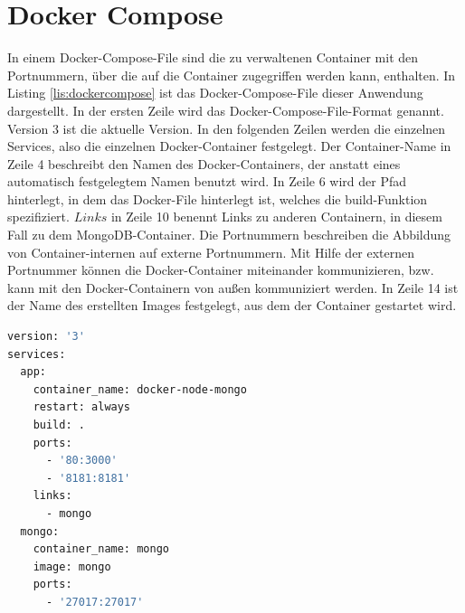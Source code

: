 \section{Docker Compose}\label{sec:Docker-Compose}
In einem Docker-Compose-File sind die zu verwaltenen Container mit den Portnummern, über die auf die Container zugegriffen werden kann, enthalten. In Listing \ref{lis:dockercompose} ist das Docker-Compose-File dieser Anwendung dargestellt. In der ersten Zeile wird das Docker-Compose-File-Format genannt. Version 3 ist die aktuelle Version. In den folgenden Zeilen werden die einzelnen Services, also die einzelnen Docker-Container festgelegt. Der Container-Name in Zeile 4 beschreibt den Namen des Docker-Containers, der anstatt eines automatisch festgelegtem Namen benutzt wird. In Zeile 6 wird der Pfad hinterlegt, in dem das Docker-File hinterlegt ist, welches die build-Funktion spezifiziert. $Links$ in Zeile 10 benennt Links zu anderen Containern, in diesem Fall zu dem MongoDB-Container. Die Portnummern beschreiben die Abbildung von Container-internen auf externe Portnummern. Mit Hilfe der externen Portnummer können die Docker-Container miteinander kommunizieren, bzw. kann mit den Docker-Containern von außen kommuniziert werden. In Zeile 14 ist der Name des erstellten Images festgelegt, aus dem der Container gestartet wird.

\begin{lstlisting}[language=bash, caption={docker-compose.yml-File}, label=lis:dockercompose]
version: '3'
services:
  app:
    container_name: docker-node-mongo
    restart: always
    build: .
    ports:
      - '80:3000'
      - '8181:8181'
    links:
      - mongo
  mongo:
    container_name: mongo
    image: mongo
    ports:
      - '27017:27017'


\end{lstlisting}


